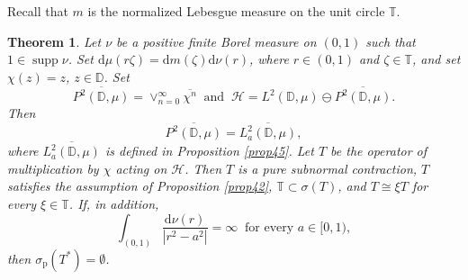 \documentclass[a4paper,oneside,11pt]{amsart}
\numberwithin{equation}{section}
\theoremstyle{plain}
\newtheorem{theorem}{Theorem}[section]
\theoremstyle{definition}
\begin{document}
Recall that $m$ is the normalized Lebesgue measure on the unit circle $\mathbb T$. 

\begin{theorem} \label{thm44} Let $\nu$ be a positive finite Borel measure on $(0,1)$ such that  $1\in\operatorname{supp}\nu$. 
 Set 
$\mathrm{d}\mu(r\zeta)=\mathrm{d}m(\zeta)\mathrm{d}\nu(r)$, where $r\in(0,1)$ and $\zeta\in\mathbb T$, 
 and set $\chi(z)=z$, $z\in\mathbb D$. 
Set 
\begin{equation*} \overline{P^2(\mathbb D,\mu)}=\vee_{n=0}^\infty\overline{\chi^n}
 \ \text{ and } \ \mathcal H=L^2(\mathbb D,\mu)\ominus\overline{P^2(\mathbb D,\mu)}.
\end{equation*}
Then  
 \begin{equation*} \overline{P^2(\mathbb D,\mu)}=\overline{L^2_a(\mathbb D,\mu)}, 
\end{equation*}
where $\overline{L^2_a(\mathbb D,\mu)}$ is defined in Proposition \ref{prop45}.
Let $T$ be the operator of multiplication by $\chi$ acting on $\mathcal H$.
Then $T$ is a pure subnormal contraction, $T$ satisfies the assumption of Proposition \ref{prop42}, $\mathbb T\subset\sigma(T)$,  and $T\cong \xi T$ for every $\xi\in\mathbb T$. If, in addition, 
\begin{equation}\label{infty}\int_{(0,1)}\frac{\mathrm{d}\nu(r)}{|r^2-a^2|}=\infty \ \text{ for every } a\in[0,1),  
\end{equation}
then $\sigma_{\mathrm{p}}(T^*)=\emptyset$.
\end{theorem}
\end{document}
